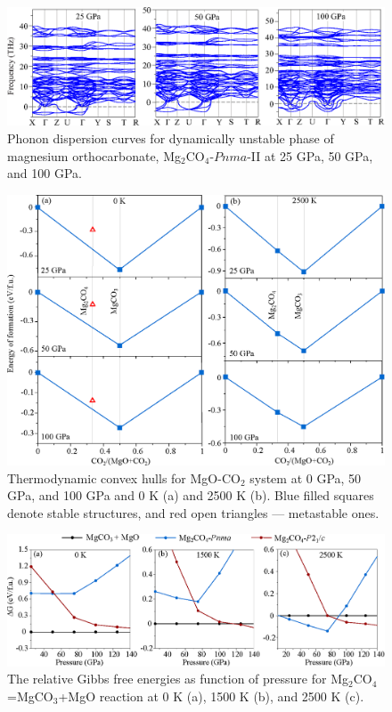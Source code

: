 \documentclass[a4paperm]{article}
\begin{document}
\begin{figure}[H]
	\includegraphics[width=\textwidth]{phon_Mg_Ca} \centering
	\caption{Phonon dispersion curves for dynamically unstable phase of magnesium orthocarbonate, Mg$_2$CO$_4$-$Pnma$-II at 25 GPa, 50 GPa, and 100 GPa.} \label{phon_PnmaII}
\end{figure}

\begin{figure}[H]
	\includegraphics[width=\textwidth]{conv_hull} \centering
	\caption{Thermodynamic convex hulls for MgO-CO$_2$ system at  0 GPa, 50 GPa, and 100 GPa and 0 K (a) and 2500 K (b). Blue filled squares denote stable structures, and red open triangles --- metastable ones.} \label{conv_hull}
\end{figure}


\begin{figure}[H]
	\includegraphics[width=\textwidth]{transition} \centering
	\caption{The relative Gibbs free energies as function of pressure for Mg$_2$CO$_4$=MgCO$_3$+MgO reaction at 0 K (a), 1500 K (b), and 2500 K (c).} \label{gibbs}
\end{figure}
\end{document}
